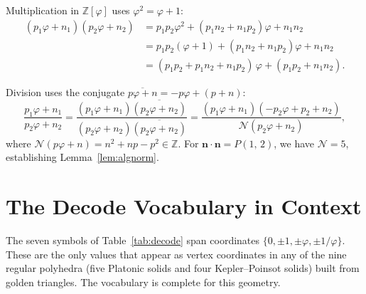\documentclass[12pt]{article}
\theoremstyle{definition}
\theoremstyle{remark}
\newcommand{\Z}{\mathbb{Z}}
\newcommand{\Zphi}{\mathbb{Z}[\varphi]}
\newcommand{\Phib}[2]{P(#1,\,#2)}
\begin{document}
Multiplication in $\Zphi$ uses $\varphi^2 = \varphi+1$:
\begin{align*}
  (p_1\varphi+n_1)(p_2\varphi+n_2)
  &= p_1 p_2\varphi^2 + (p_1 n_2 + n_1 p_2)\varphi + n_1 n_2 \\
  &= p_1 p_2(\varphi+1) + (p_1 n_2 + n_1 p_2)\varphi + n_1 n_2 \\
  &= (p_1 p_2 + p_1 n_2 + n_1 p_2)\,\varphi + (p_1 p_2 + n_1 n_2).
\end{align*}

Division uses the conjugate $\overline{p\varphi+n} = -p\varphi+(p+n)$:
\[
  \frac{p_1\varphi+n_1}{p_2\varphi+n_2}
  = \frac{(p_1\varphi+n_1)\overline{(p_2\varphi+n_2)}}
         {(p_2\varphi+n_2)\overline{(p_2\varphi+n_2)}}
  = \frac{(p_1\varphi+n_1)(-p_2\varphi+p_2+n_2)}
         {\mathcal{N}(p_2\varphi+n_2)},
\]
where $\mathcal{N}(p\varphi+n) = n^2+np-p^2 \in \Z$.
For $\mathbf{n}\cdot\mathbf{n} = \Phib{1}{2}$, we have
$\mathcal{N} = 5$, establishing Lemma~\ref{lem:algnorm}.

\section{The Decode Vocabulary in Context}

The seven symbols of Table~\ref{tab:decode} span coordinates
$\{0, \pm1, \pm\varphi, \pm1/\varphi\}$.  These are the only values
that appear as vertex coordinates in any of the nine regular polyhedra
(five Platonic solids and four Kepler--Poinsot solids) built from golden
triangles.  The vocabulary is complete for this geometry.
\end{document}
